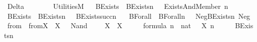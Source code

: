 %
\begin{isabellebody}%
%
%
\isadelimtheory
%
\endisadelimtheory
%
\isatagtheory
{}\isamarkupfalse%
\ Delta{}\isanewline
\ \ \ \isanewline
\ \ \ \ Utilities{\isacharunderscore}{\kern0pt}M\isanewline
{}%
\endisatagtheory
{\isafoldtheory}%
%
\isadelimtheory
\ \isanewline
%
\endisadelimtheory
\isanewline
{}\isamarkupfalse%
\ BExists{\isacharprime}{\kern0pt}\ \ {\isachardoublequoteopen}BExists{\isacharprime}{\kern0pt}{\isacharparenleft}{\kern0pt}n{\isacharcomma}{\kern0pt}\ {\isasymphi}{\isacharparenright}{\kern0pt}\ {\isasymequiv}\ Exists{\isacharparenleft}{\kern0pt}And{\isacharparenleft}{\kern0pt}Member{\isacharparenleft}{\kern0pt}{}{\isacharcomma}{\kern0pt}\ n{\isacharparenright}{\kern0pt}{\isacharcomma}{\kern0pt}\ {\isasymphi}{\isacharparenright}{\kern0pt}{\isacharparenright}{\kern0pt}{\isachardoublequoteclose}\ \ \isanewline
{}\isamarkupfalse%
\ BExists\ \ {\isachardoublequoteopen}BExists{\isacharparenleft}{\kern0pt}n{\isacharcomma}{\kern0pt}\ {\isasymphi}{\isacharparenright}{\kern0pt}\ {\isasymequiv}\ BExists{\isacharprime}{\kern0pt}{\isacharparenleft}{\kern0pt}succ{\isacharparenleft}{\kern0pt}n{\isacharparenright}{\kern0pt}{\isacharcomma}{\kern0pt}\ {\isasymphi}{\isacharparenright}{\kern0pt}{\isachardoublequoteclose}\ \isanewline
{}\isamarkupfalse%
\ BForall\ \ {\isachardoublequoteopen}BForall{\isacharparenleft}{\kern0pt}n{\isacharcomma}{\kern0pt}\ {\isasymphi}{\isacharparenright}{\kern0pt}\ {\isasymequiv}\ Neg{\isacharparenleft}{\kern0pt}BExists{\isacharparenleft}{\kern0pt}n{\isacharcomma}{\kern0pt}\ Neg{\isacharparenleft}{\kern0pt}{\isasymphi}{\isacharparenright}{\kern0pt}{\isacharparenright}{\kern0pt}{\isacharparenright}{\kern0pt}{\isachardoublequoteclose}\ \isanewline
\isanewline
{}\isamarkupfalse%
\ {\isasymDelta}{}{\isacharunderscore}{\kern0pt}from\ \ {\isachardoublequoteopen}{\isasymDelta}{}{\isacharunderscore}{\kern0pt}from{\isacharparenleft}{\kern0pt}X{\isacharparenright}{\kern0pt}\ {\isasymequiv}\ X\ {\isasymunion}\ {\isacharbraceleft}{\kern0pt}\ Nand{\isacharparenleft}{\kern0pt}{\isasymphi}{\isacharcomma}{\kern0pt}\ {\isasympsi}{\isacharparenright}{\kern0pt}{\isachardot}{\kern0pt}\ {\isacharless}{\kern0pt}{\isasymphi}{\isacharcomma}{\kern0pt}\ {\isasympsi}{\isachargreater}{\kern0pt}\ {\isasymin}\ X\ {\isasymtimes}\ X\ {\isacharbraceright}{\kern0pt}\ {\isasymunion}\ {\isacharbraceleft}{\kern0pt}\ {\isasympsi}\ {\isasymin}\ formula{\isachardot}{\kern0pt}\ {\isasymexists}n\ {\isasymin}\ nat{\isachardot}{\kern0pt}\ {\isasymexists}{\isasymphi}\ {\isasymin}\ X{\isachardot}{\kern0pt}\ n\ {\isasymnoteq}\ {}\ {\isasymand}\ {\isasympsi}\ {\isacharequal}{\kern0pt}\ BExists{\isacharprime}{\kern0pt}{\isacharparenleft}{\kern0pt}n{\isacharcomma}{\kern0pt}\ {\isasymphi}{\isacharparenright}{\kern0pt}\ {\isacharbraceright}{\kern0pt}{\isachardoublequoteclose}\ \isanewline

\end{isabellebody}
